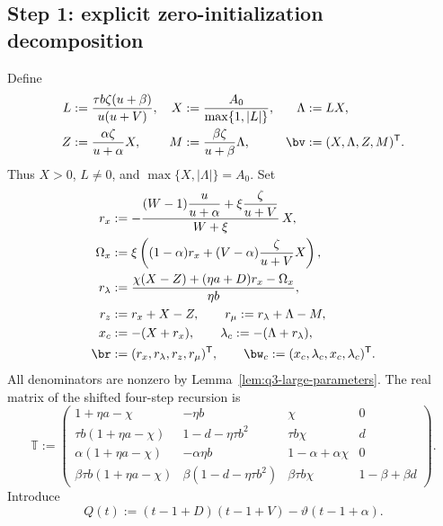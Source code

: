 \subsection{Step 1: explicit zero-initialization decomposition}
\label{subsec:q3-large-decomposition}

Define
\begin{equation}
\begin{aligned}
L&:=\frac{\tau b\zeta(u+\beta)}{u(u+V)},
&X&:=\frac{A_0}{\max\{1,|L|\}},
&\Lambda&:=LX,\\
Z&:=\frac{\alpha\zeta}{u+\alpha}X,
&M&:=\frac{\beta\zeta}{u+\beta}\Lambda,
&\bv&:=(X,\Lambda,Z,M)^{\mathsf{T}}.
\end{aligned}
\label{eq:q3-large-eigenvector}
\end{equation}
Thus \(X>0\), \(L\ne0\), and
\(\max\{X,|\Lambda|\}=A_0\).
Set
\begin{equation}
\begin{aligned}
r_x&:=-\frac{
 (W-1)\dfrac{u}{u+\alpha}
 +\xi\dfrac{\zeta}{u+V}}{W+\xi}\,X,\\
\Omega_x&:=\xi\left((1-\alpha)r_x
                  +(V-\alpha)\frac{\zeta}{u+V}X\right),\\
r_\lambda&:=\frac{\chi(X-Z)+(\eta a+D)r_x-\Omega_x}{\eta b},\\
r_z&:=r_x+X-Z,
\qquad r_\mu:=r_\lambda+\Lambda-M,\\
x_c&:=-(X+r_x),
\qquad\lambda_c:=-(\Lambda+r_\lambda),\\
\br&:=(r_x,r_\lambda,r_z,r_\mu)^{\mathsf{T}},
\qquad
\bw_c:=(x_c,\lambda_c,x_c,\lambda_c)^{\mathsf{T}}.
\end{aligned}
\label{eq:q3-large-initial-shift}
\end{equation}
All denominators are nonzero by Lemma~\ref{lem:q3-large-parameters}.
The real matrix of the shifted four-step recursion is
\begin{equation}
\mathbb{T}:=\begin{pmatrix}
1+\eta a-\chi & -\eta b & \chi & 0\\
\tau b(1+\eta a-\chi) & 1-d-\eta\tau b^2 & \tau b\chi & d\\
\alpha(1+\eta a-\chi) & -\alpha\eta b & 1-\alpha+\alpha\chi & 0\\
\beta\tau b(1+\eta a-\chi) & \beta(1-d-\eta\tau b^2)
  & \beta\tau b\chi & 1-\beta+\beta d
\end{pmatrix}.
\label{eq:q3-large-matrix}
\end{equation}
Introduce
\begin{equation}
Q(t):=(t-1+D)(t-1+V)-\vartheta(t-1+\alpha).
\label{eq:q3-large-Q}
\end{equation}

